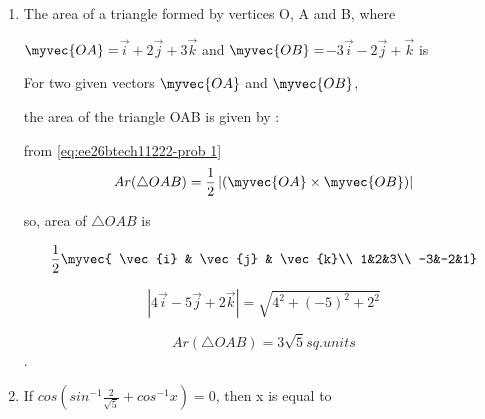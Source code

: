 
\begin{enumerate}[label=\thesubsection.\arabic*, ref=\thesubsection.\theenumi]
    



\item The area of a triangle formed by vertices O, A and B, where 

$\myvec{OA}=$$\vec{i}+2\vec{j}+3\vec{k}$$ $ and $\myvec{OB}=$$-3\vec{i}-2\vec{j}+\vec{k}$$ $ is
\begin{enumerate}
\end{enumerate}

\solution 

For two given vectors $\myvec{OA}$ and $\myvec{OB}$,

the area of the triangle OAB is given by :

from  \eqref{eq:ee26btech11222-prob 1}
\begin{align}
	Ar(\triangle OAB) = \frac{1}{2}\left|(\myvec{OA} \times \myvec{OB})\right|
\end{align}

so, area of  $\triangle OAB$ is

$$\frac{1}{2}\myvec{
\vec{i} & \vec{j} & \vec{k}\\
1&2&3\\
-3&-2&1}
$$

$$ \left|4\vec{i}-5\vec{j}+2\vec{k}\right| = \sqrt{4^2 +(-5)^2 +2^2}$$

$$Ar(\triangle OAB)=3\sqrt{5} sq.units$$.

\item

If $cos(sin^{-1}\frac{2}{\sqrt{5}}+cos^{-1}x)=0$, then x is equal to 

\begin{enumerate}
\end{enumerate}


\end{enumerate}
